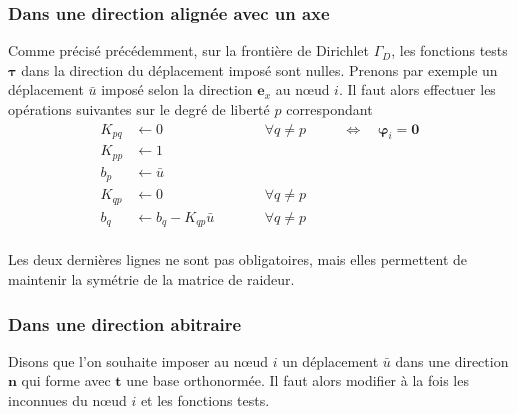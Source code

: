 \documentclass[12pt]{article}
\newcommand{\shapeu}{\boldsymbol{\varphi}}
\newcommand{\shapef}{\boldsymbol{\tau}}
\begin{document}
\subsubsection{Dans une direction alignée avec un axe}
\label{sec:dirichlet-aligned}

Comme précisé précédemment, sur la frontière de Dirichlet $\Gamma_D$, les 
fonctions tests $\shapef$ dans la direction du déplacement imposé sont nulles.
Prenons par exemple un déplacement $\bar u$ imposé selon la direction 
$\mathbf{e}_x$ au n\oe ud $i$. 
Il faut alors effectuer les opérations suivantes sur le degré de liberté $p$ 
correspondant
\begin{equation}
    \begin{alignedat}{3}
        K_{pq} &\gets 0 &&\forall q \neq p \quad && \iff\quad \shapeu_i = \mathbf{0}\\
        K_{pp} &\gets 1\\
        b_p &\gets \bar u\\
        K_{qp} &\gets 0 &&\forall q \neq p \\
        b_{q} &\gets b_q - K_{qp} \bar u \qquad &&\forall q \neq p\\
    \end{alignedat}
\end{equation}

Les deux dernières lignes ne sont pas obligatoires, mais elles permettent de
maintenir la symétrie de la matrice de raideur.

\subsubsection{Dans une direction abitraire}
Disons que l'on souhaite imposer au n\oe ud $i$ un déplacement $\bar u$ dans 
une direction $\mathbf{n}$ qui forme avec $\mathbf{t}$ une base orthonormée. 
Il faut alors modifier à la fois les inconnues du n\oe ud $i$ et les fonctions 
tests.
\end{document}
